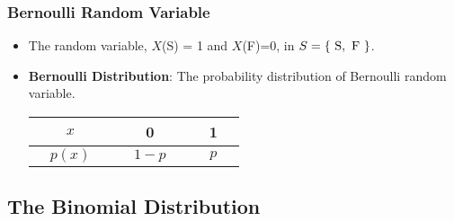 \documentclass[12pt,openany]{book}
\theoremstyle{definition}
\begin{document}
	\subsubsection{Bernoulli Random Variable}
	\begin{itemize}
		\item The random variable, $X$(S) = 1 and $X$(F)=0, in $S=\set{\ \text{S},\ \text{F}\ }$.
		\item \textbf{Bernoulli Distribution}: The probability distribution of Bernoulli random variable.\ \begin{center}
			\begin{tabular}{ccc|ccc|ccc}
				\toprule[1.2pt]
				& $x$ &&& 0 &&& 1 & \\
				\hline
				&$p(x)$ &&& $1-p$ &&& $p$ & \\
				\bottomrule[1.2pt]
			\end{tabular}
		\end{center}
	\end{itemize}
	
	\subsection{The Binomial Distribution}
	
\end{document}
